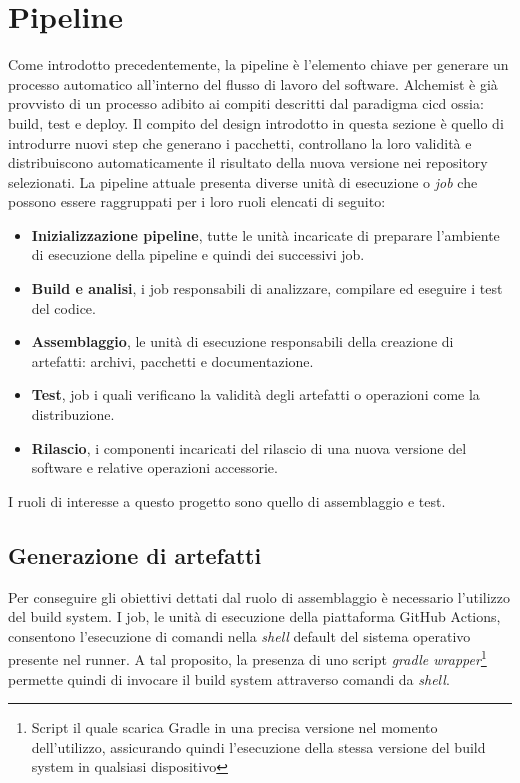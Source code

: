 \section{Pipeline}
Come introdotto precedentemente, la pipeline è l'elemento chiave per generare un processo automatico all'interno del flusso di lavoro del software. Alchemist è già provvisto di un processo adibito ai compiti descritti dal paradigma \ac{cicd} ossia: build, test e deploy. Il compito del design introdotto in questa sezione è quello di introdurre nuovi step che generano i pacchetti, controllano la loro validità e distribuiscono automaticamente il risultato della nuova versione nei repository selezionati.
La pipeline attuale presenta diverse unità di esecuzione o \textit{job} che possono essere raggruppati per i loro ruoli elencati di seguito:
\begin{itemize}
	\item \textbf{Inizializzazione pipeline}, tutte le unità incaricate di preparare l'ambiente di esecuzione della pipeline e quindi dei successivi job. 
	\item \textbf{Build e analisi}, i job responsabili di analizzare, compilare ed eseguire i test del codice.
	\item \textbf{Assemblaggio}, le unità di esecuzione responsabili della creazione di artefatti: archivi, pacchetti e documentazione.
	\item \textbf{Test}, job i quali verificano la validità degli artefatti o operazioni come la distribuzione.
	\item \textbf{Rilascio}, i componenti incaricati del rilascio di una nuova versione del software e relative operazioni accessorie.
\end{itemize}

I ruoli di interesse a questo progetto sono quello di assemblaggio e test.

\subsection{Generazione di artefatti}
Per conseguire gli obiettivi dettati dal ruolo di assemblaggio è necessario l'utilizzo del build system. I job, le unità di esecuzione della piattaforma GitHub Actions, consentono l'esecuzione di comandi nella \textit{shell} default del sistema operativo presente nel runner. A tal proposito, la presenza di uno script \textit{gradle wrapper}\footnote{Script il quale scarica Gradle in una precisa versione nel momento dell'utilizzo, assicurando quindi l'esecuzione della stessa versione del build system in qualsiasi dispositivo} permette quindi di invocare il build system attraverso comandi da \textit{shell}.


